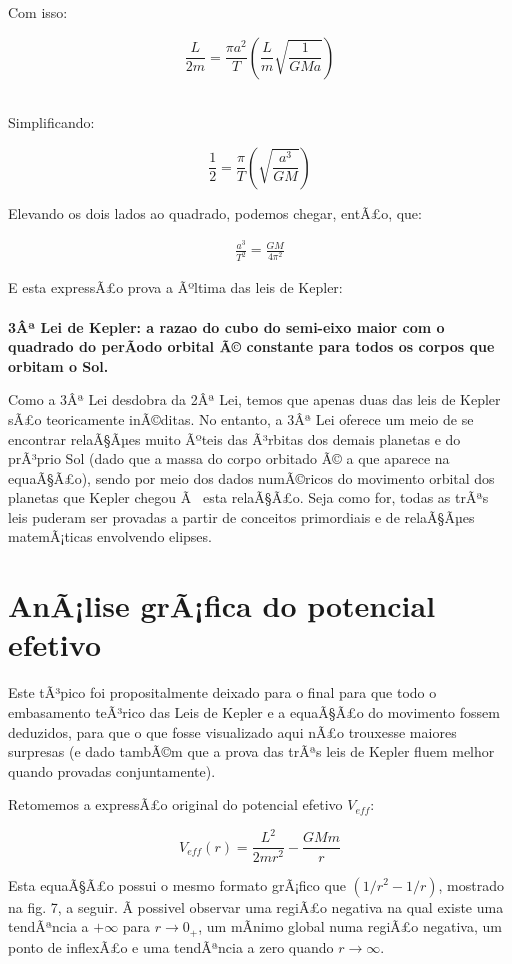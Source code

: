 Com isso:

\[
	\frac{L}{2m} = \frac{\pi a^2}{T}\left(\frac{L}{m}\sqrt{\frac{1}{GMa}}\right)
\]{\\}

Simplificando:

\[
	\frac{1}{2} = \frac{\pi}{T}\left(\sqrt{\frac{a^3}{GM}}\right)
\]

Elevando os dois lados ao quadrado, podemos chegar, entÃ£o, que:

\begin{eqnarray}
	\frac{a^3}{T^2} = \frac{GM}{4\pi^2} \label{eq57}
\end{eqnarray}

E esta expressÃ£o prova a Ãºltima das leis de Kepler:{\\}{\\}
\textbf{\Large{3Âª Lei de Kepler: a razao do cubo do semi-eixo maior com o quadrado do perÃ­odo orbital Ã© constante para todos os corpos que orbitam o Sol.}} {\\}

Como a 3Âª Lei desdobra da 2Âª Lei, temos que apenas duas das leis de Kepler sÃ£o teoricamente inÃ©ditas. No entanto, a 3Âª Lei oferece um meio de se encontrar relaÃ§Ãµes muito Ãºteis das Ã³rbitas dos demais planetas e do prÃ³prio Sol (dado que a massa do corpo orbitado Ã© a que aparece na equaÃ§Ã£o), sendo por meio dos dados numÃ©ricos do movimento orbital dos planetas que Kepler chegou Ã  esta relaÃ§Ã£o. Seja como for, todas as trÃªs leis puderam ser provadas a partir de conceitos primordiais e de relaÃ§Ãµes matemÃ¡ticas envolvendo elipses.

\section{AnÃ¡lise grÃ¡fica do potencial efetivo}

Este tÃ³pico foi propositalmente deixado para o final para que todo o embasamento teÃ³rico das Leis de Kepler e a equaÃ§Ã£o do movimento fossem deduzidos, para que o que fosse visualizado aqui nÃ£o trouxesse maiores surpresas (e dado tambÃ©m que a prova das trÃªs leis de Kepler fluem melhor quando provadas conjuntamente).{\\}

Retomemos a expressÃ£o original do potencial efetivo $V_{eff}$:

\[
	V_{eff}(r) = \frac{L^2}{2mr^2} - \frac{GMm}{r} 
\]

Esta equaÃ§Ã£o possui o mesmo formato grÃ¡fico que $(1/r^2 - 1/r)$, mostrado na fig. 7, a seguir. Ã possivel observar uma regiÃ£o negativa na qual existe uma tendÃªncia a $+\infty$ para $r \rightarrow 0_+$, um mÃ­nimo global numa regiÃ£o negativa, um ponto de inflexÃ£o e uma tendÃªncia a zero quando $r \rightarrow \infty$.

